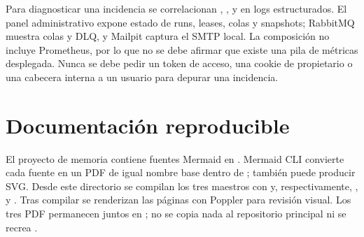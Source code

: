 Para diagnosticar una incidencia se correlacionan , ,  y  en logs estructurados. El panel administrativo expone estado de runs, leases, colas y snapshots; RabbitMQ muestra colas y DLQ, y Mailpit captura el SMTP local. La composición no incluye Prometheus, por lo que no se debe afirmar que existe una pila de métricas desplegada. Nunca se debe pedir un token de acceso, una cookie de propietario o una cabecera interna a un usuario para depurar una incidencia.

\section{Documentación reproducible}

El proyecto de memoria contiene fuentes Mermaid en . Mermaid CLI convierte cada fuente en un PDF de igual nombre base dentro de ; también puede producir SVG. Desde este directorio se compilan los tres maestros con  y, respectivamente, ,  y . Tras compilar se renderizan las páginas con Poppler para revisión visual. Los tres PDF permanecen juntos en ; no se copia nada al repositorio principal ni se recrea .
